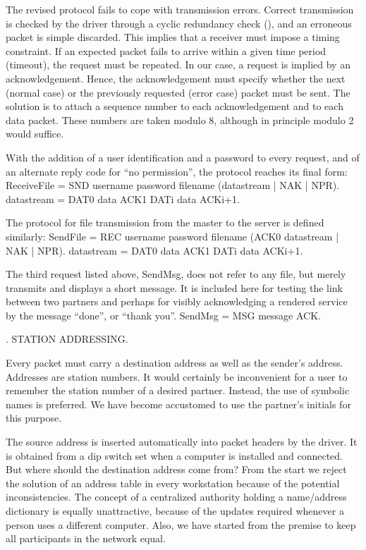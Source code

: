 The revised protocol fails to cope with transmission errors. Correct transmission is checked by the driver through a cyclic redundancy check (), and an erroneous packet is simple discarded. This implies that a receiver must impose a timing constraint. If an expected packet fails to arrive within a given time period (timeout), the request must be repeated. In our case, a request is implied by an acknowledgement. Hence, the acknowledgement must specify whether the next (normal case) or the previously requested (error case) packet must be sent. The solution is to attach a sequence number to each acknowledgement and to each data packet. These numbers are taken modulo 8, although in principle modulo 2 would suffice.

With the addition of a user identification and a password to every request, and of an alternate reply code  for ``no permission'', the protocol reaches its final form:
\begintt
ReceiveFile = SND username password filename (datastream | NAK | NPR).
datastream = DAT0 data ACK1 {DATi data ACKi+1}.
\endtt

\noindent The protocol for file transmission from the master to the server is defined similarly:
\begintt
SendFile = REC username password filename (ACK0 datastream | NAK | NPR).
datastream = DAT0 data ACK1 {DATi data ACKi+1}.
\endtt

\noindent The third request listed above, SendMsg, does not refer to any file, but merely transmits and displays a short message. It is included here for testing the link between two partners and perhaps for visibly acknowledging a rendered service by the message ``done'', or ``thank you''.
\begintt
SendMsg = MSG message ACK.
\endtt

. STATION ADDRESSING.

Every packet must carry a destination address as well as the sender's address. Addresses are station numbers. It would certainly be inconvenient for a user to remember the station number of a desired partner. Instead, the use of symbolic names is preferred. We have become accustomed to use the partner's initials for this purpose.

The source address is inserted automatically into packet headers by the driver. It is obtained from a dip switch set when a computer is installed and connected. But where should the destination address come from? From the start we reject the solution of an address table in every workstation because of the potential inconsistencies. The concept of a centralized authority holding a name/address dictionary is equally unattractive, because of the updates required whenever a person uses a different computer. Also, we have started from the premise to keep all participants in the network equal.

